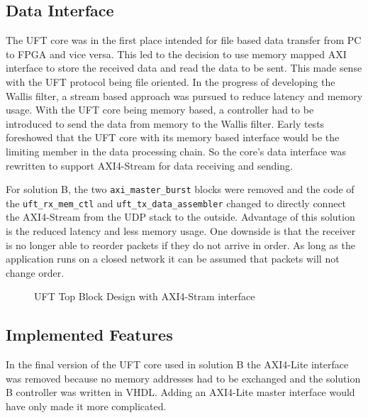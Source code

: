 \subsection{Data Interface}
The UFT core was in the first place intended for file based data transfer from
PC to FPGA and vice versa. This led to the decision to use memory mapped AXI
interface to store the received data and read the data to be sent. This made
sense with the UFT protocol being file oriented. In the progress of developing
the Wallis filter, a stream based approach was pursued to reduce latency and
memory usage. With the UFT core being memory based, a controller had to be
introduced to send the data from memory to the Wallis filter. Early tests
foreshowed that the UFT core with its memory based interface would be the
limiting member in the data processing chain. So the core's data interface was
rewritten to support AXI4-Stream for data receiving and sending.

For solution B, the two \texttt{axi\_master\_burst} blocks were removed and the
code of the \texttt{uft\_rx\_mem\_ctl} and \texttt{uft\_tx\_data\_assembler}
changed to directly connect the AXI4-Stream from the UDP stack to the outside.
Advantage of this solution is the reduced latency and less memory usage. One
downside is that the receiver is no longer able to reorder packets if they do
not arrive in order. As long as the application runs on a closed network it can
be assumed that packets will not change order.

\begin{figure}[b!]
    \centering
    \begin{adjustbox}{max width=\textwidth}
        
    \end{adjustbox}
    \caption{UFT Top Block Design with AXI4-Stram interface}
    \label{fig:ufttopstream}
\end{figure}

\clearpage
\subsection{Implemented Features}
In the final version of the UFT core used in solution B the AXI4-Lite interface
was removed because no memory addresses had to be exchanged and the solution B
controller was written in VHDL. Adding an AXI4-Lite master interface would have
only made it more complicated. 
\\

